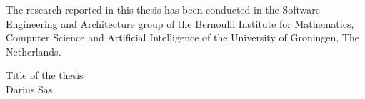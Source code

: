 \thispagestyle{empty}
\noindent

The research reported in this thesis has been conducted in the Software Engineering and Architecture group of the Bernoulli Institute for Mathematics, Computer Science and Artificial Intelligence of the University of Groningen, The Netherlands. 

\vfill\vfill\vfill


\vspace*{\fill}

\noindent Title of the thesis\\
\noindent Darius Sas\\

\normalsize
\newpage